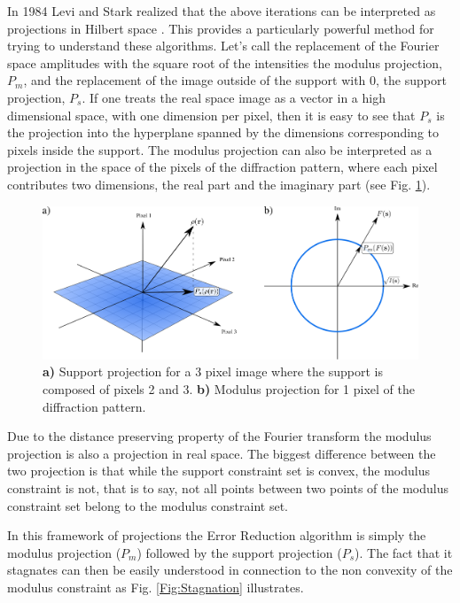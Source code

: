 In 1984 Levi and Stark realized that the above iterations can be
interpreted as projections in Hilbert space \cite{Levi1984Image}. This provides a
particularly powerful method for trying to understand these algorithms.
Let's call the replacement of the Fourier space amplitudes with the square root of
the intensities the modulus projection, $P_m$, and the replacement of the image
outside of the support with 0, the support projection, $P_s$. If one treats the
real space image as a vector in a high dimensional space, with one dimension per
pixel, then it is easy to see that $P_s$ is the projection into the hyperplane
spanned by the dimensions corresponding to pixels inside the support. The
modulus projection can also be interpreted as a projection in the space of the
pixels of the diffraction pattern, where each pixel contributes two dimensions,
the real part and the imaginary part (see Fig. \ref{Fig:Projections}). 

\begin{figure}[h]
  \centering
  \includegraphics[width=1 \columnwidth]{Image_Reconstruction/projections.png}
  \caption{{\bf a)} Support projection for a 3 pixel image where the support is
    composed of pixels 2 and 3. {\bf b)} Modulus projection for 1 pixel of the
    diffraction pattern.}
  \label{Fig:Projections}
\end{figure}

Due to the distance preserving property of the Fourier transform the modulus
projection is also a projection in real space. The biggest difference between
the two projection is that while the support constraint set is convex, the
modulus constraint is not, that is to say, not all points between two points of the modulus
constraint set belong to the modulus constraint set.

In this framework of projections the Error Reduction algorithm is simply the
modulus projection ($P_m$) followed by the support projection ($P_s$). The fact that it stagnates can then be easily understood in
connection to the non convexity of the modulus constraint as
Fig. \ref{Fig:Stagnation} illustrates.

